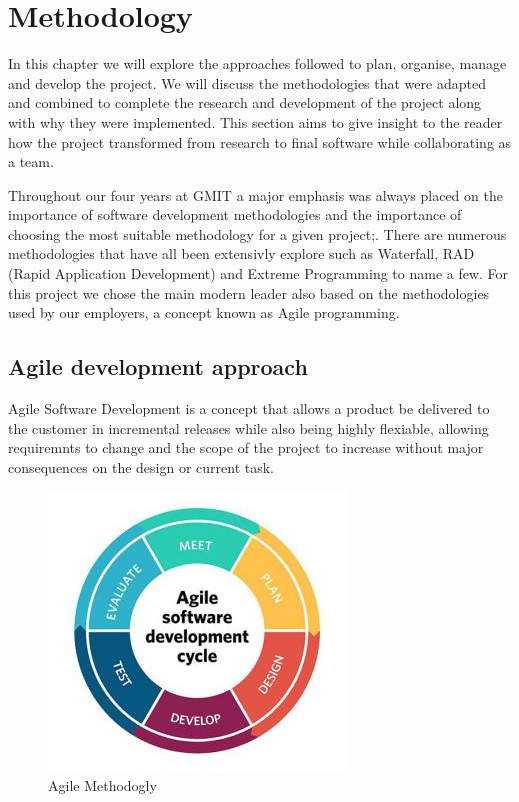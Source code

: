 \chapter{Methodology}
In this chapter we will explore the approaches followed to plan, organise, manage and develop the project. We will discuss the methodologies that were adapted and combined to complete the research and development of the project along with why they were implemented. This section aims to give insight to the reader how the project transformed from research to final software while collaborating as a team.

Throughout our four years at GMIT a major emphasis was always placed on the importance of software development methodologies and the importance of choosing the most suitable methodology for a given project;. There are numerous  methodologies that have all been extensivly explore such as Waterfall, RAD (Rapid Application Development) and Extreme Programming to name a few. For this project we chose the main modern leader also based on the methodologies used by our employers, a concept known as Agile programming.


\section{Agile development approach}
Agile Software Development is a concept that allows a product be delivered to the customer in incremental releases while also being highly flexiable, allowing requiremnts to change and the scope of the project to increase without major consequences on the design or current task.

\begin{figure}[!htb]
  \includegraphics[width=\linewidth]{img/agile.jpg}
  \caption{Agile Methodogly}
  \label{fig:AGILE}
\end{figure}

